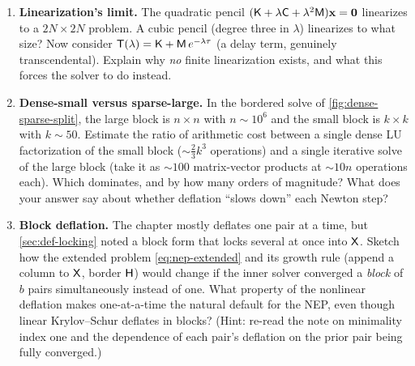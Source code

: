 \begin{enumerate}[nosep]
  the eigenvector it returns? Give a sentence of reasoning for each.
  \item \textbf{Linearization's limit.} The quadratic pencil
  $(\mathsf{K}+\lambda\mathsf{C}+\lambda^2\mathsf{M})\mathbf{x}=\mathbf 0$ linearizes to a $2N\times2N$
  problem. A cubic pencil (degree three in $\lambda$) linearizes to what size? Now
  consider $\mathsf{T}(\lambda)=\mathsf{K}+\mathsf{M}\,e^{-\lambda\tau}$ (a delay term, genuinely
  transcendental). Explain why \emph{no} finite linearization exists, and what
  this forces the solver to do instead.
  \item \textbf{Dense-small versus sparse-large.} In the bordered solve of
  \cref{fig:dense-sparse-split}, the large block is $n\times n$ with
  $n\sim10^6$ and the small block is $k\times k$ with $k\sim50$. Estimate the
  ratio of arithmetic cost between a single dense LU factorization of the small
  block ($\sim\tfrac23 k^3$ operations) and a single iterative solve of the large
  block (take it as $\sim100$ matrix-vector products at $\sim10n$ operations each).
  Which dominates, and by how many orders of magnitude? What does your answer say
  about whether deflation ``slows down'' each Newton step?
  \item \textbf{Block deflation.} The chapter mostly deflates one pair at a time,
  but \cref{sec:def-locking} noted a block form that locks several at once into
  $\mathsf{X}$. Sketch how the extended problem \cref{eq:nep-extended} and its growth
  rule (append a column to $\mathsf{X}$, border $\mathsf{H}$) would change if the inner
  solver converged a \emph{block} of $b$ pairs simultaneously instead of one. What
  property of the nonlinear deflation makes one-at-a-time the natural default for
  the NEP, even though linear Krylov--Schur deflates in blocks? (Hint: re-read the
  note on minimality index one and the dependence of each pair's deflation on the
  prior pair being fully converged.)
\end{enumerate}
